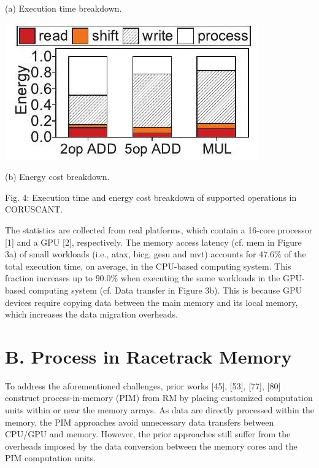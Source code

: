 \documentclass[10pt]{article}
\begin{document}
(a) Execution time breakdown.

\begin{center}
\includegraphics[max width=\textwidth]{2024_05_12_abeba8a85da5b5ec4c7bg-03}
\end{center}

(b) Energy cost breakdown.

Fig. 4: Execution time and energy cost breakdown of supported operations in CORUSCANT.

The statistics are collected from real platforms, which contain a 16-core processor [1] and a GPU [2], respectively. The memory access latency (cf. mem in Figure 3a) of small workloads (i.e., atax, bicg, gesu and mvt) accounts for $47.6 \%$ of the total execution time, on average, in the CPU-based computing system. This fraction increases up to $90.0 \%$ when executing the same workloads in the GPU-based computing system (cf. Data transfer in Figure 3b). This is because GPU devices require copying data between the main memory and its local memory, which increases the data migration overheads.

\section*{B. Process in Racetrack Memory}
To address the aforementioned challenges, prior works [45], [53], [77], [80] construct process-in-memory (PIM) from RM by placing customized computation units within or near the memory arrays. As data are directly processed within the memory, the PIM approaches avoid unnecessary data transfers between CPU/GPU and memory. However, the prior approaches still suffer from the overheads imposed by the data conversion between the memory cores and the PIM computation units.
\end{document}
